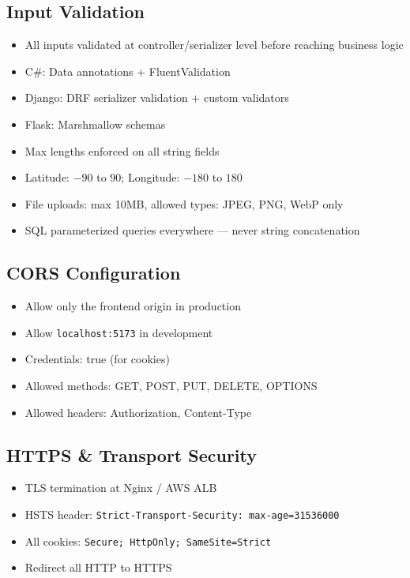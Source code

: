 \documentclass[12pt,letterpaper]{article}
\begin{document}
\subsection{Input Validation}
\begin{itemize}
  \item All inputs validated at controller/serializer level before reaching business logic
  \item C\#: Data annotations + FluentValidation
  \item Django: DRF serializer validation + custom validators
  \item Flask: Marshmallow schemas
  \item Max lengths enforced on all string fields
  \item Latitude: $-90$ to $90$; Longitude: $-180$ to $180$
  \item File uploads: max 10MB, allowed types: JPEG, PNG, WebP only
  \item SQL parameterized queries everywhere --- never string concatenation
\end{itemize}

\subsection{CORS Configuration}
\begin{itemize}
  \item Allow only the frontend origin in production
  \item Allow \texttt{localhost:5173} in development
  \item Credentials: true (for cookies)
  \item Allowed methods: GET, POST, PUT, DELETE, OPTIONS
  \item Allowed headers: Authorization, Content-Type
\end{itemize}

\subsection{HTTPS \& Transport Security}
\begin{itemize}
  \item TLS termination at Nginx / AWS ALB
  \item HSTS header: \texttt{Strict-Transport-Security: max-age=31536000}
  \item All cookies: \texttt{Secure; HttpOnly; SameSite=Strict}
  \item Redirect all HTTP to HTTPS
\end{itemize}
\end{document}
